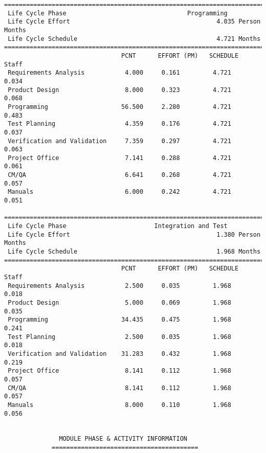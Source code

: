 \documentclass[11pt,a4paper,spanish,twoside]{report}
\begin{document}
{\begin{verbatim}
==============================================================================
 Life Cycle Phase                                 Programming
 Life Cycle Effort                                        4.035 Person Months
 Life Cycle Schedule                                      4.721 Months
==============================================================================
                                PCNT      EFFORT (PM)   SCHEDULE       Staff   
 Requirements Analysis           4.000     0.161         4.721        0.034
 Product Design                  8.000     0.323         4.721        0.068
 Programming                    56.500     2.280         4.721        0.483
 Test Planning                   4.359     0.176         4.721        0.037
 Verification and Validation     7.359     0.297         4.721        0.063
 Project Office                  7.141     0.288         4.721        0.061
 CM/QA                           6.641     0.268         4.721        0.057
 Manuals                         6.000     0.242         4.721        0.051

==============================================================================
 Life Cycle Phase                        Integration and Test
 Life Cycle Effort                                        1.380 Person Months
 Life Cycle Schedule                                      1.968 Months
==============================================================================
                                PCNT      EFFORT (PM)   SCHEDULE       Staff   
 Requirements Analysis           2.500     0.035         1.968        0.018
 Product Design                  5.000     0.069         1.968        0.035
 Programming                    34.435     0.475         1.968        0.241
 Test Planning                   2.500     0.035         1.968        0.018
 Verification and Validation    31.283     0.432         1.968        0.219
 Project Office                  8.141     0.112         1.968        0.057
 CM/QA                           8.141     0.112         1.968        0.057
 Manuals                         8.000     0.110         1.968        0.056


		       MODULE PHASE & ACTIVITY INFORMATION
		     ========================================


\end{verbatim}}
\end{document}
